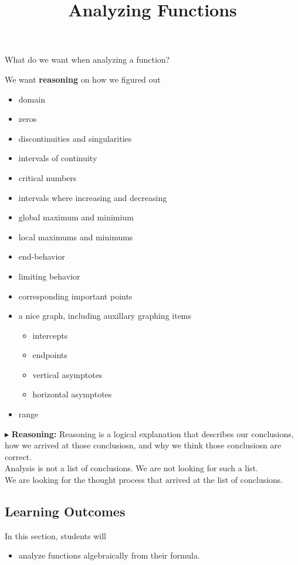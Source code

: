 \documentclass{ximera}
\title{Analyzing Functions}
\begin{document}
\begin{abstract}
%
\end{abstract}
\maketitle






What do we want when analyzing a function?


We want \textbf{\textcolor{red!80!black}{reasoning}} on how we figured out

\begin{itemize}
\item domain
\item zeros 
\item discontinuities and singularities
\item intervals of continuity
\item critical numbers
\item intervals where increasing and decreasing
\item global maximum and minimium
\item local maximums and minimums
\item end-behavior
\item limiting behavior
\item corresponding important points
\item a nice graph, including auxillary graphing items
\begin{itemize}
	\item intercepts
	\item endpoints
	\item vertical asymptotes
	\item horizontal asymptotes
\end{itemize}
\item range
\end{itemize}



$\blacktriangleright$ \textbf{\textcolor{red!80!black}{Reasoning:}} Reasoning is a logical explanation that describes our conclusions, how we arrived at those conclusiosn, and why we think those conclusiosn are correct. \\

Analysis is not a list of conclusions. We are not looking for such a list. \\

We are looking for the thought process that arrived at the list of conclusions. \\





\subsection{Learning Outcomes}


\begin{sectionOutcomes}
In this section, students will 

\begin{itemize}
\item analyze functions algebraically from their formula.
\end{itemize}
\end{sectionOutcomes}
\end{document}

